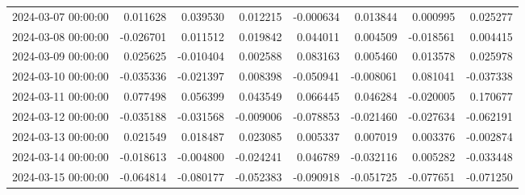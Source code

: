 \begin{tabular}{lrrrrrrr}
2024-03-07 00:00:00 & 0.011628 & 0.039530 & 0.012215 & -0.000634 & 0.013844 & 0.000995 & 0.025277 \\
2024-03-08 00:00:00 & -0.026701 & 0.011512 & 0.019842 & 0.044011 & 0.004509 & -0.018561 & 0.004415 \\
2024-03-09 00:00:00 & 0.025625 & -0.010404 & 0.002588 & 0.083163 & 0.005460 & 0.013578 & 0.025978 \\
2024-03-10 00:00:00 & -0.035336 & -0.021397 & 0.008398 & -0.050941 & -0.008061 & 0.081041 & -0.037338 \\
2024-03-11 00:00:00 & 0.077498 & 0.056399 & 0.043549 & 0.066445 & 0.046284 & -0.020005 & 0.170677 \\
2024-03-12 00:00:00 & -0.035188 & -0.031568 & -0.009006 & -0.078853 & -0.021460 & -0.027634 & -0.062191 \\
2024-03-13 00:00:00 & 0.021549 & 0.018487 & 0.023085 & 0.005337 & 0.007019 & 0.003376 & -0.002874 \\
2024-03-14 00:00:00 & -0.018613 & -0.004800 & -0.024241 & 0.046789 & -0.032116 & 0.005282 & -0.033448 \\
2024-03-15 00:00:00 & -0.064814 & -0.080177 & -0.052383 & -0.090918 & -0.051725 & -0.077651 & -0.071250 \\
\bottomrule
\end{tabular}
